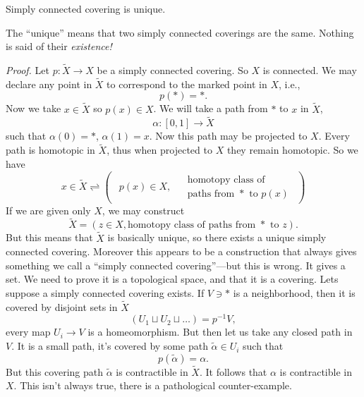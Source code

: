 
\begin{prop}
Simply connected covering is unique.
\end{prop}
The ``unique'' means that two simply connected coverings are the
same. Nothing is said of their \emph{existence!}

\medbreak
\noindent\emph{Proof.}\quad\ignorespaces%
Let $p\colon\widetilde{X}\to X$ be a simply connected
covering. So $X$ is connected. We may declare any point in
$\widetilde{X}$ to correspond to the marked point in $X$, i.e.,
\begin{equation}
p(*)=*.
\end{equation}
Now we take $x\in\widetilde{X}$ so $p(x)\in X$.
We will take a path from $*$ to $x$ in $\widetilde{X}$,
\begin{equation}
\alpha\colon[0,1]\to\widetilde{X}
\end{equation}
such that $\alpha(0)=*$, $\alpha(1)=x$. Now this path may be
projected to $X$. Every path is homotopic in $\widetilde{X}$,
thus when projected to $X$ they remain homotopic. So we have
\begin{equation}
x\in\widetilde{X}\rightleftharpoons\begin{pmatrix}
\begin{matrix}p(x)\in X,
\end{matrix}
&
\begin{matrix}
\mbox{homotopy class of}\\
\mbox{paths from $*$ to $p(x)$}
\end{matrix}
\end{pmatrix}
\end{equation}
If we are given only $X$, we may construct
\begin{equation}
\widetilde{X}=(z\in X,\mbox{homotopy class of paths from $*$ to $z$}).
\end{equation}
But this means that $\widetilde{X}$ is basically unique, so there
exists a unique simply connected covering. Moreover this appears
to be a construction that always gives something we call a
``simply connected covering''---but this is wrong. It gives a
set. We need to prove it is a topological space, and that it is a
covering. Lets suppose a simply connected covering exists. If
$V\ni *$ is a neighborhood, then it is covered by disjoint sets
in $\widetilde{X}$
\begin{equation}
(U_1\sqcup U_2\sqcup\dots)=p^{-1}V,
\end{equation}
every map $U_i\to V$ is a homeomorphism. But then let us take any
closed path in $V$. It is a small path, it's covered by some path
$\widetilde{\alpha}\in U_i$ such that
\begin{equation}
p(\widetilde{\alpha})=\alpha.
\end{equation}
But this covering path $\widetilde{\alpha}$ is contractible in
$\widetilde{X}$. It follows that $\alpha$ is contractible in
$X$. This isn't always true, there is a pathological
counter-example.


